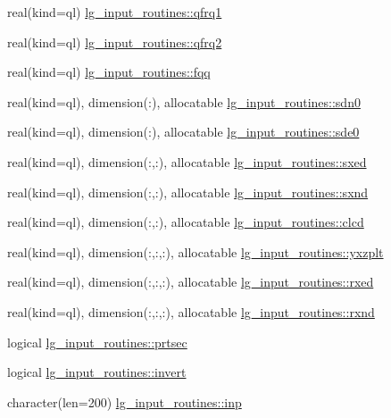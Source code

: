 \begin{DoxyCompactItemize}
\item 
real(kind=ql) \hyperlink{namespacelg__input__routines_afda4a8689fe9682f5d258652b9034e8b}{lg\+\_\+input\+\_\+routines\+::qfrq1}
\item 
real(kind=ql) \hyperlink{namespacelg__input__routines_ac2deecae32da0c3386427796c078914b}{lg\+\_\+input\+\_\+routines\+::qfrq2}
\item 
real(kind=ql) \hyperlink{namespacelg__input__routines_a8482cf4c4f82b0bdade2229ebe84409b}{lg\+\_\+input\+\_\+routines\+::fqq}
\item 
real(kind=ql), dimension(\+:), allocatable \hyperlink{namespacelg__input__routines_a772bd4b791e045aeddee4ec3b9f83b5d}{lg\+\_\+input\+\_\+routines\+::sdn0}
\item 
real(kind=ql), dimension(\+:), allocatable \hyperlink{namespacelg__input__routines_a61c10a981d7dbd76a267c0287d588341}{lg\+\_\+input\+\_\+routines\+::sde0}
\item 
real(kind=ql), dimension(\+:,\+:), allocatable \hyperlink{namespacelg__input__routines_a97c7be4355c05e28ac6ba0efeb78ffad}{lg\+\_\+input\+\_\+routines\+::sxed}
\item 
real(kind=ql), dimension(\+:,\+:), allocatable \hyperlink{namespacelg__input__routines_aa2783aeeaa7e437824f169ebfa8333b6}{lg\+\_\+input\+\_\+routines\+::sxnd}
\item 
real(kind=ql), dimension(\+:,\+:), allocatable \hyperlink{namespacelg__input__routines_ae8692e647d0f89e881c118c611840cd9}{lg\+\_\+input\+\_\+routines\+::clcd}
\item 
real(kind=ql), dimension(\+:,\+:,\+:), allocatable \hyperlink{namespacelg__input__routines_aced5de847a907addba6fcf36ebf42331}{lg\+\_\+input\+\_\+routines\+::yxzplt}
\item 
real(kind=ql), dimension(\+:,\+:,\+:), allocatable \hyperlink{namespacelg__input__routines_a67fb3d402119d1b2a9e63ce396fecab0}{lg\+\_\+input\+\_\+routines\+::rxed}
\item 
real(kind=ql), dimension(\+:,\+:,\+:), allocatable \hyperlink{namespacelg__input__routines_a6d8afefe7edd3b38c43af674dc6a8cf2}{lg\+\_\+input\+\_\+routines\+::rxnd}
\item 
logical \hyperlink{namespacelg__input__routines_ac5e8dec1c471c81460b4a0f5072f8032}{lg\+\_\+input\+\_\+routines\+::prtsec}
\item 
logical \hyperlink{namespacelg__input__routines_a8a8f780e770a419032c0f864583b10b3}{lg\+\_\+input\+\_\+routines\+::invert}
\item 
character(len=200) \hyperlink{namespacelg__input__routines_a288298e67f0d988bf7778f7d3e647080}{lg\+\_\+input\+\_\+routines\+::inp}

\end{DoxyCompactItemize}
